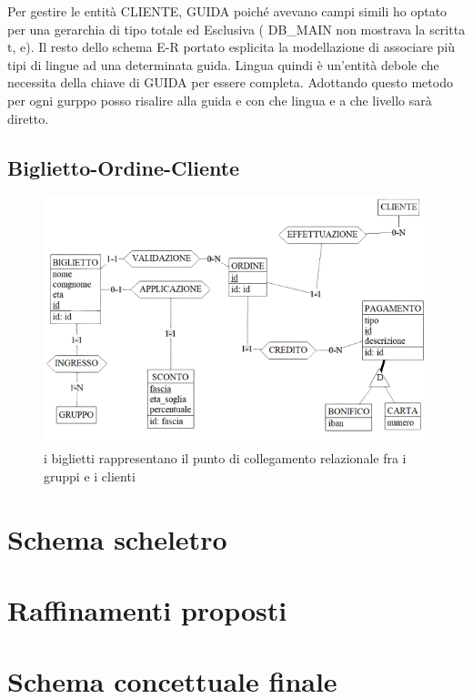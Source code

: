 \documentclass[a4paper,12pt]{report}
\begin{document}
Per gestire le entità CLIENTE, GUIDA poiché ave\-vano campi
simili ho optato per una gerar\-chia di tipo totale ed Esclusiva 
( DB\_MAIN non mostrava la scritta t, e)\-.
Il resto dello schema E-R portato esplicita la modellazione di associare 
più tipi di lingue ad una determinata guida. Lingua quindi è un'entità debole
che necessita della chiave di GUIDA per essere completa. Adottando questo metodo
per ogni gurppo posso risalire alla guida e con che lingua e a che livello sarà
diretto.

\subsection*{Biglietto-Ordine-Cliente}

\begin{figure}[H]
	\centering
	\includegraphics[width=0.99\textwidth]{BIGLIETTO-ORDINE.png}
	\caption{i biglietti rappresentano il punto di collegamento relazionale fra i gruppi e i clienti}
\end{figure}



\section{Schema scheletro}


\section{Raffinamenti proposti}
\section{Schema concettuale finale}
\end{document}
